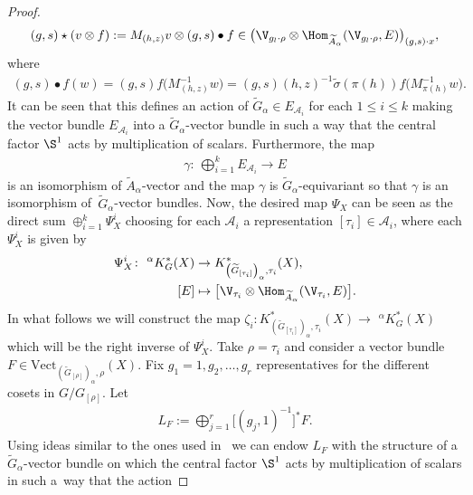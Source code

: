 \begin{proof}
\begin{gather*}
(g,s)\star (v\otimes f):=M_{(h,z)}v\otimes (g,s)\bullet
f \in \big(\V_{g_{l}\cdot\rho}\otimes
\Hom_{\widetilde{A}_{\alpha}}(\V_{g_{l}\cdot\rho},E)\big)_{(g,s)\cdot x},
\end{gather*}
where
\begin{gather*}
(g,s)\bullet f(w)=(g,s)f\big(M_{(h,z)}^{-1}w\big)
=(g,s)(h,z)^{-1}\tilde{\sigma}(\pi(h))f\big(M_{\pi(h)}^{-1}w\big).
\end{gather*}
It can be seen that this defines an action of $\widetilde{G}_{\alpha}\in E_{\mathcal{A}_{i}}$
for each $1\leq i\leq k$ making the vector bundle $E_{\mathcal{A}_{i}}$
into a $\widetilde{G}_{\alpha}$-vector bundle in such a way that the central factor
$\S^{1}$ acts by multiplication of scalars. Furthermore, the map
\begin{gather*}
\gamma\colon\ \bigoplus_{i=1}^{k}E_{\mathcal{A}_{i}} \rightarrow E
\end{gather*}
is an isomorphism of $\widetilde{A}_{\alpha}$-vector and the map $\gamma$ is
$\widetilde{G}_{\alpha}$-equivariant so that $\gamma$ is an isomorphism of~$\widetilde{G}_{\alpha}$-vector bundles. Now, the desired map $\Psi_{X}$ can be seen as the
direct sum $\oplus_{i=1}^{k}\Psi_{X}^{i}$ choosing for each $\mathcal{A}_{i}$ a representation
$[\tau_{i}]\in\mathcal{A}_{i}$, where each $\Psi_{X}^{i}$ is given by
\begin{align*}
\Psi_{X}^{i}\colon \phantom{i}^{\alpha}K_{G}^{\ast}(X)&\rightarrow
K^{*}_{\left(\widetilde{G}_{[\tau_{i}]}\right)_{\alpha},\tau_{i}}(X),
\\
[E]&\mapsto \big[\V_{\tau_{i}}\otimes\Hom_{\widetilde{A}_{\alpha}}(\V_{\tau_{i}},E)\big].
\end{align*}
In what follows we will construct the map
$\zeta_{i}\colon K^{*}_{\left(\widetilde{G}_{[\tau_{i}]}\right)_{\alpha},\tau_{i}}(X)
\rightarrow \phantom{i}^{\alpha}K_{G}^{\ast}(X)$
which will be the right inverse of $\Psi_{X}^{i}$. Take $\rho=\tau_{i}$ and consider
a vector bundle $F\in\text{Vect}_{\left(\widetilde{G}_{[\rho]}\right)_{\alpha},\rho}(X)$.
Fix $g_{1}=1,g_{2},\dots,g_{r}$ representatives for the different cosets in $G/G_{[\rho]}$.
Let
\begin{gather*}
L_{F}:=\bigoplus_{j=1}^{r}\big[(g_{j},1)^{-1}\big]^{\ast} F.
\end{gather*}
Using ideas similar to the ones used in~\cite[Theorem 3.1]{GomezUribe} we can endow $L_{F}$
with the structure of a $\widetilde{G}_{\alpha}$-vector bundle on which the
central factor $\S^{1}$ acts by multiplication of scalars in such a~way that the action

\end{proof}
